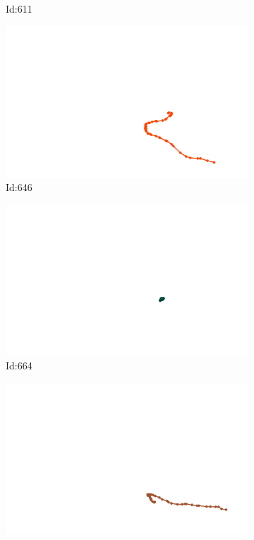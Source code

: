 \documentclass[12pt,twoside]{report}
\begin{document}
\begin{figure}
\begin{subfigure}[b]{0.20\textwidth}
\caption{Id:611}
\end{subfigure}
\begin{subfigure}[b]{0.20\textwidth}
\centering
\includegraphics[width=\textwidth]{../trajectories/646.png}
\caption{Id:646}
\end{subfigure}
\begin{subfigure}[b]{0.20\textwidth}
\centering
\includegraphics[width=\textwidth]{../trajectories/664.png}
\caption{Id:664}
\end{subfigure}
\begin{subfigure}[b]{0.20\textwidth}
\centering
\includegraphics[width=\textwidth]{../trajectories/740.png}

\end{subfigure}
\end{figure}
\end{document}
